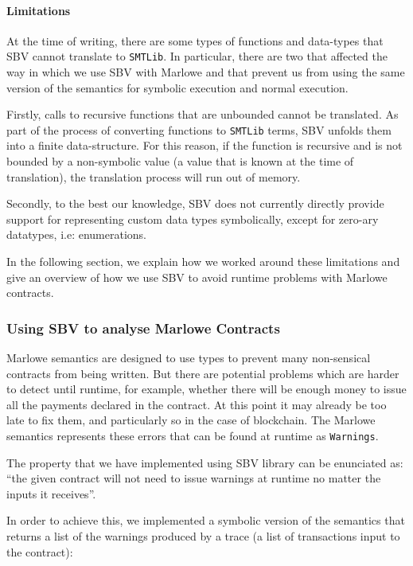 \documentclass[runningheads]{llncs}
\begin{document}
\paragraph{Limitations}

At the time of writing, there are some types of functions and data-types that SBV cannot translate to \texttt{SMTLib}. In particular, there are two that affected the way in which we use SBV with Marlowe and that prevent us from using the same version of the semantics for symbolic execution and normal execution.

Firstly, calls to recursive functions that are unbounded cannot be translated. As part of the process of converting functions to \texttt{SMTLib} terms, SBV unfolds them into a finite data-structure. For this reason, if the function is recursive and is not bounded by a non-symbolic value (a value that is known at the time of translation), the translation process will run out of memory.

Secondly, to the best our knowledge, SBV does not currently directly provide support for representing custom data types symbolically, except for zero-ary datatypes, i.e: enumerations.

In the following section, we explain how we worked around these limitations and give an overview of how we use SBV to avoid runtime problems with Marlowe contracts.

\subsubsection{Using SBV to analyse Marlowe Contracts}

Marlowe semantics are designed to use types to prevent many non-sensical contracts from being written. But there are potential problems which are harder to detect until runtime, for example, whether there will be enough money to issue all the payments declared in the contract. At this point it may already be too late to fix them, and particularly so in the case of blockchain. The Marlowe semantics represents these errors that can be found at runtime as \texttt{Warnings}.

The property that we have implemented using SBV library can be enunciated as: ``the given contract will not need to issue warnings at runtime no matter the inputs it receives''.

In order to achieve this, we implemented a symbolic version of the semantics that returns a list of the warnings produced by a trace (a list of transactions input to the contract):
\end{document}
